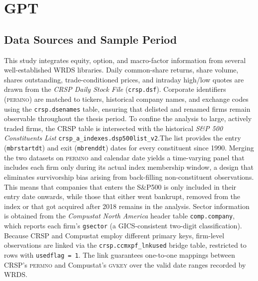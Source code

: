 





\section{GPT}
\subsection{Data Sources and Sample Period}\label{sec:data_sources}

This study integrates equity, option, and macro-factor information from several well-established WRDS libraries. Daily common-share returns, share volume, shares outstanding, trade-conditioned prices, and intraday high/low quotes are drawn from the \emph{CRSP Daily Stock File} (\texttt{crsp.dsf}). Corporate identifiers (\textsc{permno}) are matched to tickers, historical company names, and exchange codes using the \texttt{crsp.dsenames} table, ensuring that delisted and renamed firms remain observable throughout the thesis period. To confine the analysis to large, actively traded firms, the CRSP table is intersected with the historical \emph{S\&P 500 Constituents List} \texttt{crsp\_a\_indexes.dsp500list\_v2}.The list provides the entry (\texttt{mbrstartdt}) and exit (\texttt{mbrenddt}) dates for every constituent since 1990. Merging the two datasets on \textsc{permno} and calendar date yields a time-varying panel that includes each firm only during its actual index membership window, a design that eliminates survivorship bias arising from back-filling non-constituent observations. This means that companies that enters the S\&P500 is only included in their entry date onwards, while those that either went bankrupt, removed from the index or that got acquired after 2018 remains in the analysis. Sector information is obtained from the \emph{Compustat North America} header table \texttt{comp.company}, which reports each firm's \texttt{gsector} (a GICS-consistent two-digit classification). Because CRSP and Compustat employ different primary keys, firm-level observations are linked via the \texttt{crsp.ccmxpf\_lnkused} bridge table, restricted to rows with \texttt{usedflag = 1}. The link guarantees one-to-one mappings between CRSP's \textsc{permno} and Compustat's \textsc{gvkey} over the valid date ranges recorded by WRDS.

